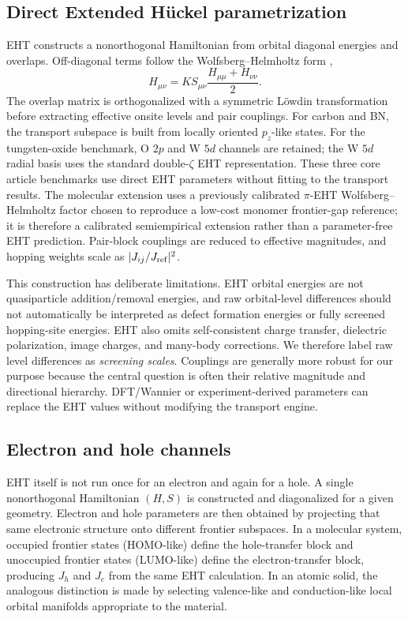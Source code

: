 \documentclass[aps,prmaterials,reprint,amsmath,amssymb,superscriptaddress,longbibliography]{revtex4-2}
\begin{document}
\subsection{Direct Extended H\"uckel parametrization}
EHT constructs a nonorthogonal Hamiltonian from orbital diagonal energies and overlaps. Off-diagonal terms follow the Wolfsberg--Helmholtz form \cite{wolfsberg1952,hoffmann1963},
\begin{equation}
H_{\mu\nu}=K S_{\mu\nu}\frac{H_{\mu\mu}+H_{\nu\nu}}{2}.
\end{equation}
The overlap matrix is orthogonalized with a symmetric L\"owdin transformation before extracting effective onsite levels and pair couplings. For carbon and BN, the transport subspace is built from locally oriented $p_z$-like states. For the tungsten-oxide benchmark, O $2p$ and W $5d$ channels are retained; the W $5d$ radial basis uses the standard double-$\zeta$ EHT representation. These three core article benchmarks use direct EHT parameters without fitting to the transport results. The molecular extension uses a previously calibrated $\pi$-EHT Wolfsberg--Helmholtz factor chosen to reproduce a low-cost monomer frontier-gap reference; it is therefore a calibrated semiempirical extension rather than a parameter-free EHT prediction. Pair-block couplings are reduced to effective magnitudes, and hopping weights scale as $|J_{ij}/J_{\rm ref}|^2$.

This construction has deliberate limitations. EHT orbital energies are not quasiparticle addition/removal energies, and raw orbital-level differences should not automatically be interpreted as defect formation energies or fully screened hopping-site energies. EHT also omits self-consistent charge transfer, dielectric polarization, image charges, and many-body corrections. We therefore label raw level differences as \emph{screening scales}. Couplings are generally more robust for our purpose because the central question is often their relative magnitude and directional hierarchy. DFT/Wannier or experiment-derived parameters can replace the EHT values without modifying the transport engine.

\subsection{Electron and hole channels}
EHT itself is not run once for an electron and again for a hole. A single nonorthogonal Hamiltonian $(H,S)$ is constructed and diagonalized for a given geometry. Electron and hole parameters are then obtained by projecting that same electronic structure onto different frontier subspaces. In a molecular system, occupied frontier states (HOMO-like) define the hole-transfer block and unoccupied frontier states (LUMO-like) define the electron-transfer block, producing $J_h$ and $J_e$ from the same EHT calculation. In an atomic solid, the analogous distinction is made by selecting valence-like and conduction-like local orbital manifolds appropriate to the material.
\end{document}
